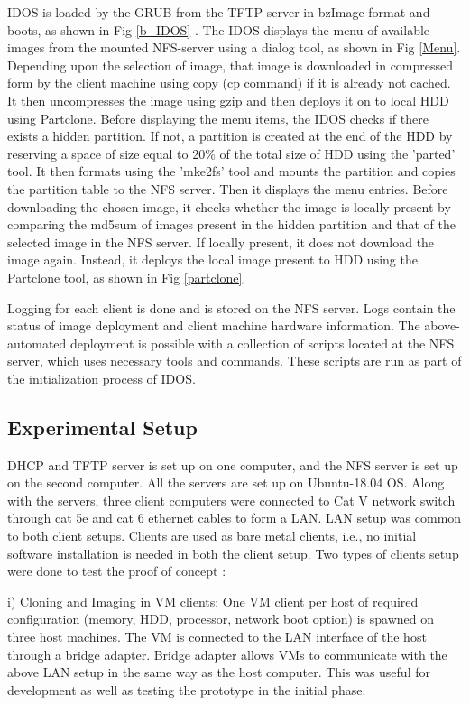 \documentclass[a4paper,12pt]{article}
\begin{document}
IDOS is loaded by the GRUB from the TFTP server in bzImage format and boots, as shown in Fig \ref{b_IDOS} . The IDOS displays the menu of available images from the mounted NFS-server using a dialog tool, as shown in Fig \ref{Menu}. Depending upon the selection of image, that image is downloaded in compressed form by the client machine using copy (cp command) if it is already not cached. It then uncompresses the image using gzip and then deploys it on to local HDD using Partclone. Before displaying the menu items, the IDOS checks if there exists a hidden partition. If not, a partition is created at the end of the HDD by reserving a space of size equal to 20\% of the total size of HDD using the 'parted' tool. It then formats using the 'mke2fs' tool and mounts the partition and copies the partition table to the NFS server. Then it displays the menu entries. Before downloading the chosen image, it checks whether the image is locally present by comparing the md5sum of images present in the hidden partition and that of the selected image in the NFS server. If locally present, it does not download the image again. Instead, it deploys the local image present to HDD using the Partclone tool, as shown in Fig \ref{partclone}.

Logging for each client is done and is stored on the NFS server. Logs contain the status of image deployment and client machine hardware information. The above-automated deployment is possible with a collection of scripts located at the NFS server, which uses necessary tools and commands. These scripts are run as part of the initialization process of IDOS.

\subsection{ Experimental Setup}
DHCP and TFTP server is set up on one computer, and the NFS server is set up on the second computer. All the servers are set up on Ubuntu-18.04 OS. Along with the servers, three client computers were connected to Cat V network switch through cat 5e and cat 6 ethernet cables to form a LAN. LAN setup was common to both client setups. Clients are used as bare metal clients, i.e., no initial software installation is needed in both the client setup.
Two types of clients setup were done to test the proof of concept :

i) Cloning and Imaging in VM clients: One VM client per host of required configuration (memory, HDD, processor, network boot option) is spawned on three host machines. The VM is connected to the LAN interface of the host through a bridge adapter. Bridge adapter allows VMs to communicate with the above  LAN setup in the same way as the host computer. This was useful for development as well as testing the prototype in the initial phase.
\end{document}
